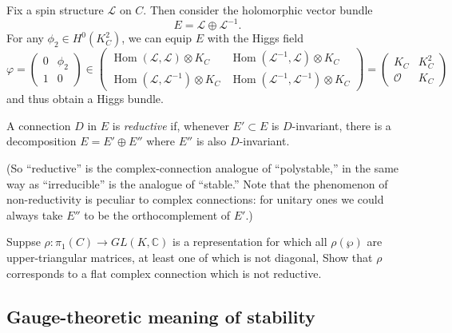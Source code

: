 \documentclass[12pt,letterpaper,reqno]{article}
\numberwithin{equation}{section}
\newcommand{\cL}{\ensuremath{\mathcal L}}
\newcommand{\cO}{\ensuremath{\mathcal O}}
\newcommand{\C}{\ensuremath{\mathbb C}}
\newcommand{\ti}[1]{\textit{#1}}
\DeclareMathOperator{\Hom}{Hom}
\begin{document}
\begin{example} \label{exa:hitchin-section-SL2} 
Fix a spin structure
$\cL$ on $C$.
Then consider the holomorphic vector
bundle
\begin{equation}
  E = \cL \oplus \cL^{-1}.
\end{equation}
For any $\phi_2 \in H^0(K_C^2)$,
we can equip $E$ with the Higgs field
\begin{equation}
  \varphi = \begin{pmatrix} 0 & \phi_2 \\ 1 & 0 \end{pmatrix} \in \begin{pmatrix} \Hom(\cL,\cL) \otimes K_C & \Hom(\cL^{-1},\cL) \otimes K_C \\ \Hom(\cL,\cL^{-1}) \otimes K_C & \Hom(\cL^{-1},\cL^{-1}) \otimes K_C \end{pmatrix} = \begin{pmatrix} K_C & K_C^2 \\ \cO & K_C \end{pmatrix}
\end{equation}
and thus obtain a Higgs bundle.
\end{example}



\begin{defn} A connection $D$ in $E$
is \ti{reductive} if, whenever $E' \subset E$ is $D$-invariant,
there is a decomposition $E = E' \oplus E''$ where $E''$ is
also $D$-invariant. 
\end{defn}

(So ``reductive'' is the complex-connection analogue of ``polystable,''
in the same way as ``irreducible'' is the analogue of ``stable.'' 
Note that the phenomenon of non-reductivity 
is peculiar to complex connections: for 
unitary ones we could always take $E''$ to be the orthocomplement
of $E'$.)

\begin{exercise}
Suppse $\rho: \pi_1(C) \to GL(K,\C)$ is a representation for which all
$\rho(\wp)$ are upper-triangular matrices, at least one 
of which is not diagonal,
Show that $\rho$ corresponds to a flat complex connection 
which is not reductive.
\end{exercise}

\subsection{Gauge-theoretic meaning of stability}
\end{document}
